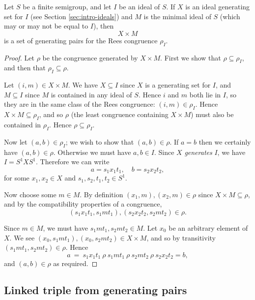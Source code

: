 \begin{theorem}
  Let $S$ be a finite semigroup, and let $I$ be an ideal of $S$.  If $X$ is an ideal
  generating set for $I$ (see Section \ref{sec:intro-ideals}) and $M$
  is the minimal ideal of $S$ (which may or may not be equal to $I$), then
  $$X \times M$$ is a set of generating pairs for the Rees congruence $\rho_I$.
  \begin{proof}
    Let $\rho$ be the congruence generated by $X \times M$.  First we show that
    $\rho \subseteq \rho_I$, and then that $\rho_I \subseteq \rho$.

    Let $(i,m) \in X \times M$.  We have $X \subseteq I$ since $X$ is a
    generating set for $I$, and $M \subseteq I$ since $M$ is contained in any
    ideal of $S$.  Hence $i$ and $m$ both lie in $I$, so they are in the same
    class of the Rees congruence: $(i,m) \in \rho_I$.  Hence $X \times M
    \subseteq \rho_I$, and so $\rho$ (the least congruence containing $X \times
    M$) must also be contained in $\rho_I$.  Hence $\rho \subseteq \rho_I$.

    Now let $(a,b) \in \rho_I$; we wish to show that $(a,b) \in \rho$.  If $a=b$
    then we certainly have $(a,b) \in \rho$.  Otherwise we must have $a,b \in
    I$.  Since $X$ \textit{generates} $I$, we have $I = S^1XS^1$.  Therefore we
    can write
    $$a = s_1x_1t_1, \quad b = s_2x_2t_2,$$
    for some $x_1,x_2 \in X$ and $s_1,s_2,t_1,t_2 \in S^1$.

    Now choose some $m \in M$.  By definition $(x_1,m), (x_2,m) \in \rho$ since
    $X \times M \subseteq \rho$, and
    by the compatibility properties of a congruence,
    $$(s_1x_1t_1,s_1mt_1), (s_2x_2t_2,s_2mt_2) \in \rho.$$

    Since $m \in M$, we must have $s_1mt_1,s_2mt_2 \in M$.  Let $x_0$ be an
    arbitrary element of $X$.
    We see $(x_0,s_1mt_1), (x_0,s_2mt_2) \in X \times M$, and so by transitivity
    $(s_1mt_1, s_2mt_2) \in \rho$.
    Hence
    $$a ~=~ s_1x_1t_1 ~\rho~ s_1mt_1 ~\rho~ s_2mt_2 ~\rho~ s_2x_2t_2 = b,$$
    and $(a,b) \in \rho$ as required.
  \end{proof}
\end{theorem}

\subsection{Linked triple from generating pairs}
\label{sec:pairs-to-linked-triple}

